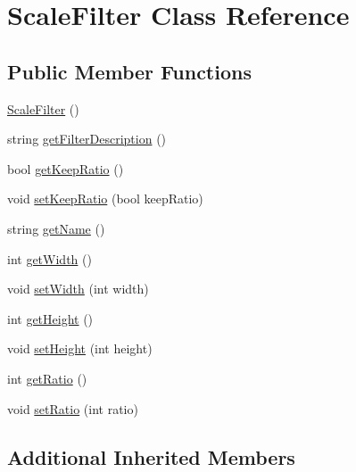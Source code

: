 \hypertarget{classModel_1_1Filter_1_1ScaleFilter}{}\section{Scale\+Filter Class Reference}
\label{classModel_1_1Filter_1_1ScaleFilter}
\subsection*{Public Member Functions}
\begin{DoxyCompactItemize}
\item 
\hyperlink{classModel_1_1Filter_1_1ScaleFilter_a97c359581f0dd70601196694efdace5a}{Scale\+Filter} ()
\item 
string \hyperlink{classModel_1_1Filter_1_1ScaleFilter_a62b7b60e24f92234393b840b35808e06}{get\+Filter\+Description} ()
\item 
bool \hyperlink{classModel_1_1Filter_1_1ScaleFilter_a24f2abc27a0f228db8763dbecb6ad326}{get\+Keep\+Ratio} ()
\item 
void \hyperlink{classModel_1_1Filter_1_1ScaleFilter_a8a9a32b92c6a9dc160091d8886ba13dc}{set\+Keep\+Ratio} (bool keep\+Ratio)
\item 
string \hyperlink{classModel_1_1Filter_1_1ScaleFilter_a11335e13e50af74108bf926dc1340b4b}{get\+Name} ()
\item 
int \hyperlink{classModel_1_1Filter_1_1ScaleFilter_a67a0997183f24da19b776d96c1052998}{get\+Width} ()
\item 
void \hyperlink{classModel_1_1Filter_1_1ScaleFilter_a8b4c8bccc530aa0a9b0139e04913af32}{set\+Width} (int width)
\item 
int \hyperlink{classModel_1_1Filter_1_1ScaleFilter_a07efb2a4e9a982688c8bb3c3f21d1092}{get\+Height} ()
\item 
void \hyperlink{classModel_1_1Filter_1_1ScaleFilter_a7013185ad2825ade83994b396c4fdfcd}{set\+Height} (int height)
\item 
int \hyperlink{classModel_1_1Filter_1_1ScaleFilter_ae46369a45bda66dc98d82f36c3025e79}{get\+Ratio} ()
\item 
void \hyperlink{classModel_1_1Filter_1_1ScaleFilter_a862467c05166d50d0ea15bca3ca1414d}{set\+Ratio} (int ratio)
\end{DoxyCompactItemize}
\subsection*{Additional Inherited Members}


